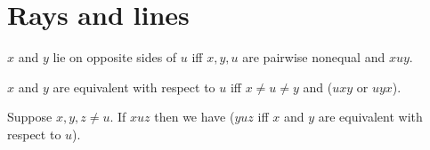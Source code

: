 \documentclass[10pt,a4paper,parskip=half,numbers=endperiod,headings=standardclasses,parskip]{scrbook}
\newcommand{\Betw}[3]{#1 #2 #3}
\begin{document}
  \section{Rays and lines}

  \begin{forthel}
    \begin{definition}
      $x$ and $y$ lie on opposite sides of $u$ iff
      $x, y, u$ are pairwise nonequal and $\Betw{x}{u}{y}$.
    \end{definition}

    \begin{definition}
      $x$ and $y$ are equivalent with respect to $u$ iff $x\neq u \neq y$ and ($\Betw{u}{x}{y}$ or $\Betw{u}{y}{x}$).
    \end{definition}

    \begin{lemma}
      Suppose $x,y,z \neq u$.
      If $\Betw{x}{u}{z}$
      then we have
        ($\Betw{y}{u}{z}$ iff $x$ and $y$ are equivalent with respect to $u$).
    \end{lemma}
  \end{forthel}

  \doclicenseThis
\end{document}
